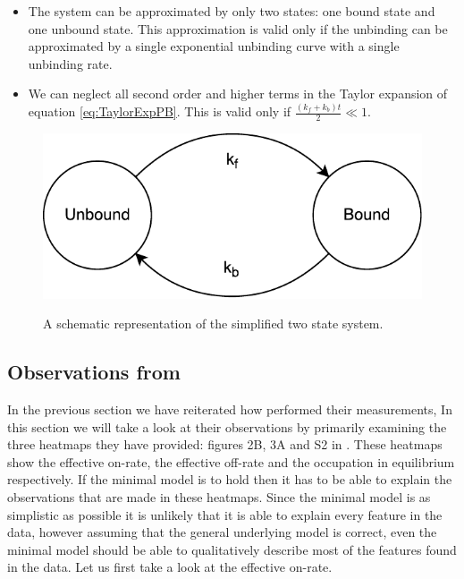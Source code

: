 \begin{itemize}
\item The system can be approximated by only two states: one bound state and one unbound state. This approximation is valid only if the unbinding can be approximated by a single exponential unbinding curve with a single unbinding rate.
\item We can neglect all second order and higher terms in the Taylor expansion of equation \ref{eq:TaylorExpPB}. This is valid only if $\frac{(k_f+k_b)t}{2} \ll 1$.
\end{itemize}

\begin{figure}[H]
\begin{center}
\includegraphics[width=\textwidth]{images/TwoState}
\label{fig:two-state-model}
\caption{A schematic representation of the simplified two state system.}
\end{center}
\end{figure}
 


\subsection{Observations from \cite{PNAS}}

In the previous section we have reiterated how \cite{PNAS} performed their measurements, In this section we will take a look at their observations by primarily examining the three heatmaps they have provided: figures 2B, 3A and S2 in \cite{PNAS}.
These heatmaps show the effective on-rate, the effective off-rate and the occupation in equilibrium respectively. If the minimal model is to hold then it has to be able to explain the observations that are made in these heatmaps. Since the minimal model is as simplistic as possible it is unlikely that it is able to explain every feature in the data, however assuming that the general underlying model is correct, even the minimal model should be able to qualitatively describe most of the features found in the data. Let us first take a look at the effective on-rate.

